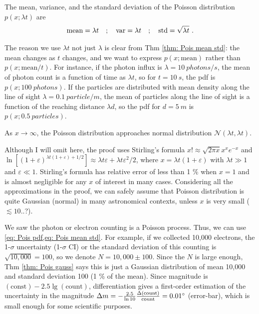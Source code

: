 \begin{thm} \label{thm: Pois mean std}
The mean, variance, and the standard deviation of the Poisson distribution $ p(x; \lambda t) $ are
\begin{equation}\label{eq: Pois mean std}
  \mathrm{mean} = \lambda t
  \quad;\quad
  \mathrm{var} = \lambda t
  \quad;\quad
  \mathrm{std} = \sqrt{\lambda t} ~.
\end{equation}
\end{thm}
The reason we use $ \lambda t $ not just $ \lambda $ is clear from Thm \ref{thm: Pois mean std}: the mean changes as $ t $ changes, and we want to express $ p(x; \mathrm{mean}) $ rather than $ p(x; \mathrm{mean} / t) $. For instance, if the photon influx is $ \lambda = \SI{10}{photons / s} $, the mean of photon count is a function of time as $ \lambda t $, so for $ t = \SI{10}{s} $, the pdf is $ p(x; \SI{100}{photons}) $. If the particles are distributed with mean density along the line of sight $ \lambda = \SI{0.1}{particle / m} $, the mean of particles along the line of sight is a function of the reaching distance $ \lambda d $, so the pdf for $ d = \SI{5}{m} $ is $ p(x; \SI{0.5}{particles}) $. 

\begin{thm} \label{thm: Pois gauss}
As $ x \rightarrow \infty $, the Poisson distribution approaches normal distribution $ \mathcal{N}( \lambda t, \lambda t ) $.
\end{thm}
Although I will omit here, the proof uses Stirling's formula $ x! \approx \sqrt{2\pi x} x^x e^{-x} $ and $ \ln[ (1 + \varepsilon)^{\lambda t (1 + \varepsilon) + 1 / 2 }] \approx \lambda t \varepsilon + \lambda t \varepsilon^2 / 2 $, where $ x = \lambda t ( 1 + \varepsilon ) $ with $ \lambda t \gg 1 $ and $ \varepsilon \ll 1 $. Stirling's formula has relative error of less than 1 \% when $ x = 1 $ and is almost negligible for any $ x $ of interest in many cases. Considering all the approximations in the proof, we can safely assume that Poisson distribution is quite Gaussian (normal) in many astronomical contexts, unless $ x $ is very small ($ \lesssim 10 $..?).

\begin{ex}
We saw the photon or electron counting is a Poisson process. Thus, we can use \cref{eq: Pois pdf,eq: Pois mean std}. For example, if we collected 10,000 electrons, the 1-$ \sigma $ uncertainty (1-$ \sigma $ CI) or the standard deviation of this counting is $ \sqrt{10,000} = 100 $, so we denote $ N = 10,000 \pm 100 $. Since the $ N $ is large enough, Thm \ref{thm: Pois gauss} says this is just a Gaussian distribution of mean 10,000 and standard deviation 100 (1 \% of the mean). Since magnitude is $ (\mathrm{const}) - 2.5 \lg (\mathrm{count}) $, differentiation gives a first-order estimation of the uncertainty in the magnitude $ \Delta m = -\frac{2.5}{\ln 10} \frac{\Delta (\mathrm{count})}{\mathrm{count}} = \m{0.01} $ (error-bar), which is small enough for some scientific purposes.
\end{ex}

